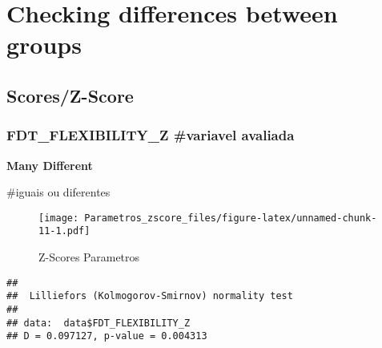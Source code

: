 \documentclass[
]{article}
\newenvironment{Shaded}{\begin{snugshade}}{\end{snugshade}}
\newcommand{\AttributeTok}[1]{\textcolor[rgb]{0.13,0.29,0.53}{#1}}
\newcommand{\DecValTok}[1]{\textcolor[rgb]{0.00,0.00,0.81}{#1}}
\newcommand{\FunctionTok}[1]{\textcolor[rgb]{0.13,0.29,0.53}{\textbf{#1}}}
\newcommand{\NormalTok}[1]{#1}
\newcommand{\SpecialCharTok}[1]{\textcolor[rgb]{0.81,0.36,0.00}{\textbf{#1}}}
\newcommand{\StringTok}[1]{\textcolor[rgb]{0.31,0.60,0.02}{#1}}
\begin{document}
\section{\texorpdfstring{\textbf{Checking differences between
groups}}{Checking differences between groups}}\label{checking-differences-between-groups-9}

\subsection{\texorpdfstring{\textbf{Scores/Z-Score}}{Scores/Z-Score}}\label{scoresz-score-9}

\subsubsection{FDT\_FLEXIBILITY\_Z \#variavel
avaliada}\label{fdt_flexibility_z-variavel-avaliada}

\textbf{Many Different}

\#iguais ou diferentes

\begin{Shaded}
\end{Shaded}

\begin{figure}
\centering
\texttt{[image: Parametros\_zscore\_files/figure-latex/unnamed-chunk-11-1.pdf]}
\caption{Z-Scores Parametros}
\end{figure}

\begin{Shaded}
\end{Shaded}

\begin{verbatim}
## 
##  Lilliefors (Kolmogorov-Smirnov) normality test
## 
## data:  data$FDT_FLEXIBILITY_Z
## D = 0.097127, p-value = 0.004313
\end{verbatim}

\begin{Shaded}
\end{Shaded}
\end{document}
